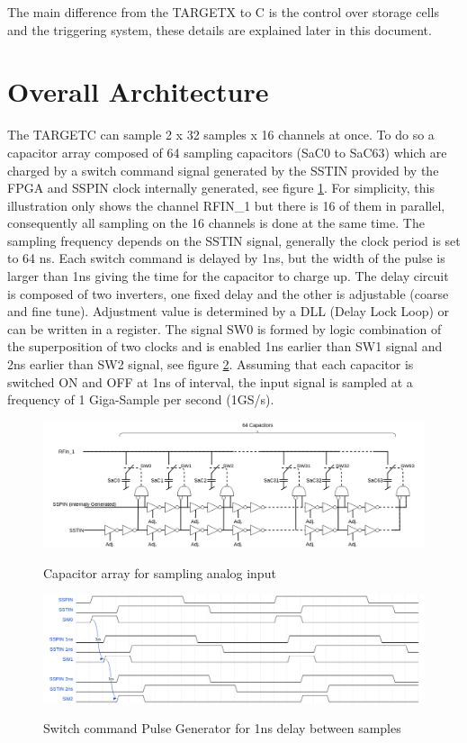 \noindent
The main difference from the TARGETX to C is the control over storage cells and the triggering system, these details are explained later in this document.

\newpage
\section{Overall Architecture}
The TARGETC can sample 2 x 32 samples x 16 channels at once. To do so a capacitor array composed of 64 sampling capacitors (SaC0 to SaC63) which are charged by a switch command signal generated by the SSTIN provided by the FPGA and SSPIN clock internally generated,  see figure \ref{fig:capacitorarray2}. For simplicity, this illustration only shows the channel RFIN\_1 but there is 16 of them in parallel, consequently all sampling on the 16 channels is done at the same time. The sampling frequency depends on the SSTIN signal, generally the clock period is set to 64 ns. Each switch command is delayed by 1ns, but the width of the pulse is larger than 1ns giving the time for the capacitor to charge up. The delay circuit is composed of two inverters, one fixed delay and the other is adjustable (coarse and fine tune). Adjustment value is determined by a DLL (Delay Lock Loop) or can be written in a register. The signal SW0 is formed by logic combination of the superposition of two clocks and is enabled 1ns earlier than SW1 signal and 2ns earlier than SW2  signal, see figure \ref{fig:pulse1ns}. Assuming that each capacitor is switched ON and OFF at 1ns of interval, the input signal is sampled at a frequency of 1 Giga-Sample per second (1GS/s).

\begin{figure}[H]
\centering
\includegraphics[width=1\textwidth]{figures/capacitor_array.png}\\
\caption{\label{fig:capacitorarray2} Capacitor array for sampling analog input}
\end{figure}

\begin{figure}[H]
\centering
\includegraphics[width=1\textwidth]{figures/wavedrom/switchPulse.png}\\
\caption{\label{fig:pulse1ns} Switch command Pulse Generator for 1ns delay between samples}
\end{figure}

